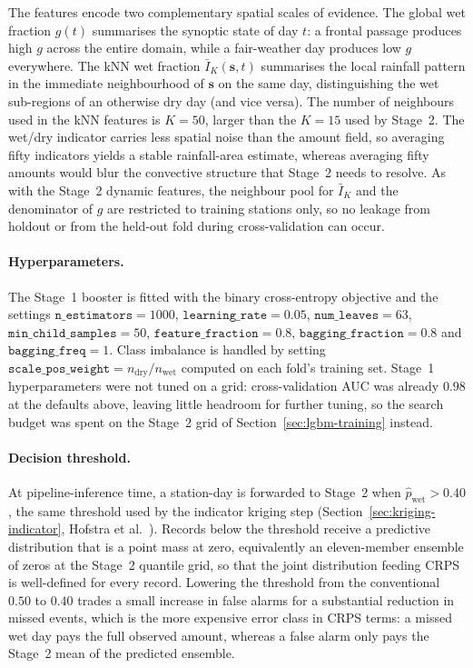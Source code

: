 The features encode two complementary spatial scales of evidence. The
global wet fraction $g(t)$ summarises the synoptic state of day $t$: a
frontal passage produces high $g$ across the entire domain, while a
fair-weather day produces low $g$ everywhere. The kNN wet fraction
$\bar{I}_K(\mathbf{s}, t)$ summarises the local rainfall pattern in
the immediate neighbourhood of $\mathbf{s}$ on the same day,
distinguishing the wet sub-regions of an otherwise dry day (and vice
versa). The number of neighbours used in the kNN features is
$K = 50$, larger than the $K = 15$ used by Stage~2. The wet/dry
indicator carries less spatial noise than the amount field, so
averaging fifty indicators yields a stable rainfall-area estimate,
whereas averaging fifty amounts would blur the convective structure
that Stage~2 needs to resolve. As with the Stage~2 dynamic features,
the neighbour pool for $\bar{I}_K$ and the denominator of $g$ are
restricted to training stations only, so no leakage from holdout or
from the held-out fold during cross-validation can occur.

\paragraph{Hyperparameters.}
\begin{sloppypar}
The Stage~1 booster is fitted with the binary cross-entropy objective
and the settings $\texttt{n\_estimators} = 1000$,
$\texttt{learning\_rate} = 0{.}05$, $\texttt{num\_leaves} = 63$,
$\texttt{min\_child\_samples} = 50$, $\texttt{feature\_fraction} = 0{.}8$,
$\texttt{bagging\_fraction} = 0{.}8$ and $\texttt{bagging\_freq} = 1$.
Class imbalance is handled by setting
$\texttt{scale\_pos\_weight} = n_{\mathrm{dry}} / n_{\mathrm{wet}}$
computed on each fold's training set. Stage~1 hyperparameters were not
tuned on a grid: cross-validation AUC was already $0{.}98$ at the
defaults above, leaving little headroom for further tuning, so the
search budget was spent on the Stage~2 grid of
Section~\ref{sec:lgbm-training} instead.
\end{sloppypar}

\paragraph{Decision threshold.} At pipeline-inference time, a
station-day is forwarded to Stage~2 when
$\hat{p}_{\mathrm{wet}} > 0{.}40$, the same threshold used by the
indicator kriging step (Section~\ref{sec:kriging-indicator}, Hofstra
et al.~\cite{hofstra2008comparison}). Records below the threshold
receive a predictive distribution that is a point mass at zero,
equivalently an eleven-member ensemble of zeros at the Stage~2
quantile grid, so that the joint distribution feeding CRPS is
well-defined for every record. Lowering the threshold from the
conventional $0{.}50$ to $0{.}40$ trades a small increase in false
alarms for a substantial reduction in missed events, which is the
more expensive error class in CRPS terms: a missed wet day pays the
full observed amount, whereas a false alarm only pays the Stage~2
mean of the predicted ensemble.


